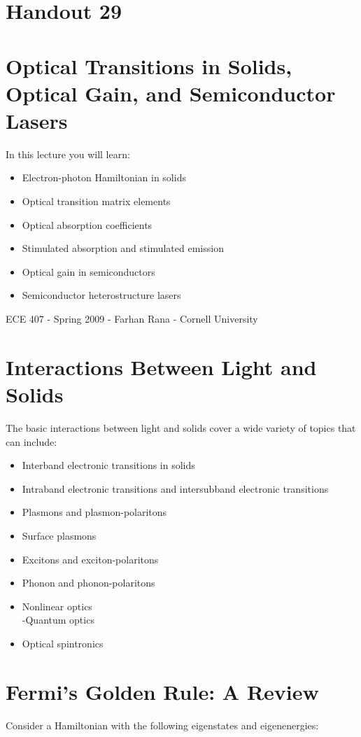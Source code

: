 \documentclass[10pt]{article}
\begin{document}
\captionsetup{singlelinecheck=false}
\section*{Handout 29}
\section*{Optical Transitions in Solids, Optical Gain, and Semiconductor Lasers}
In this lecture you will learn:

\begin{itemize}
  \item Electron-photon Hamiltonian in solids
  \item Optical transition matrix elements
  \item Optical absorption coefficients
  \item Stimulated absorption and stimulated emission
  \item Optical gain in semiconductors
  \item Semiconductor heterostructure lasers
\end{itemize}

ECE 407 - Spring 2009 - Farhan Rana - Cornell University

\section*{Interactions Between Light and Solids}
The basic interactions between light and solids cover a wide variety of topics that can include:

\begin{itemize}
  \item Interband electronic transitions in solids
  \item Intraband electronic transitions and intersubband electronic transitions
  \item Plasmons and plasmon-polaritons
  \item Surface plasmons
  \item Excitons and exciton-polaritons
  \item Phonon and phonon-polaritons
  \item Nonlinear optics\\
-Quantum optics
  \item Optical spintronics
\end{itemize}

\section*{Fermi's Golden Rule: A Review}
Consider a Hamiltonian with the following eigenstates and eigenenergies:
\end{document}
